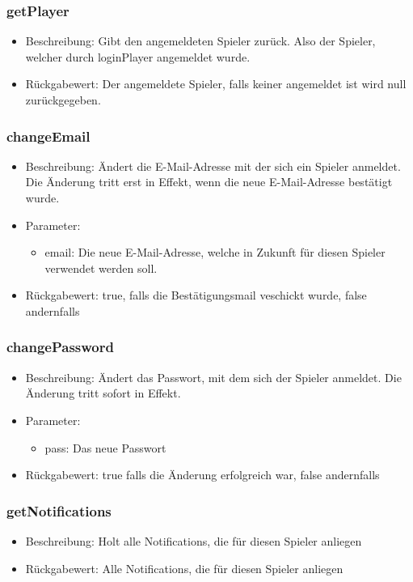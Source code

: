\documentclass[a4paper]{scrreprt}
\begin{document}
	\subsubsection{getPlayer}
	\begin{itemize}
		\item Beschreibung: Gibt den angemeldeten Spieler zurück. Also der Spieler, welcher durch loginPlayer angemeldet wurde.
		\item Rückgabewert: Der angemeldete Spieler, falls keiner angemeldet ist wird null zurückgegeben.
	\end{itemize}
	\subsubsection{changeEmail}
	\begin{itemize}
		\item Beschreibung: Ändert die E-Mail-Adresse mit der sich ein Spieler anmeldet. Die Änderung tritt erst in Effekt, wenn die neue E-Mail-Adresse bestätigt wurde.
		\item Parameter:
		\begin{itemize}
			\item email: Die neue E-Mail-Adresse, welche in Zukunft für diesen Spieler verwendet werden soll.
		\end{itemize}
		\item Rückgabewert: true, falls die Bestätigungsmail veschickt wurde, false andernfalls
	\end{itemize}
	\subsubsection{changePassword}
	\begin{itemize}
		\item Beschreibung: Ändert das Passwort, mit dem sich der Spieler anmeldet. Die Änderung tritt sofort in Effekt.
		\item Parameter:
		\begin{itemize}
			\item pass: Das neue Passwort
		\end{itemize}
		\item Rückgabewert: true falls die Änderung erfolgreich war, false andernfalls
	\end{itemize}
	\subsubsection{getNotifications}
	\begin{itemize}
		\item Beschreibung: Holt alle Notifications, die für diesen Spieler anliegen
		\item Rückgabewert:  Alle Notifications, die für diesen Spieler anliegen
	\end{itemize}
\end{document}
